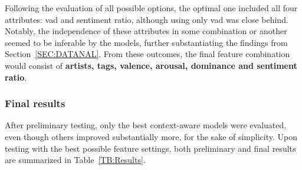 Following the evaluation of all possible options, the optimal one included all four attributes: \acs{vad} and sentiment ratio, although using only \acs{vad} was close behind. Notably, the independence of these attributes in some combination or another seemed to be inferable by the models, further substantiating the findings from Section~\ref{SEC:DATANAL}. From these outcomes, the final feature combination would consist of \textbf{artists, tags, valence, arousal, dominance and sentiment ratio}.

\subsubsection{Final results}

After preliminary testing, only the best context-aware models were evaluated, even though others improved substantially more, for the sake of simplicity. Upon testing with the best possible feature settings, both preliminary and final results are summarized in Table~\ref{TB:Results}.

